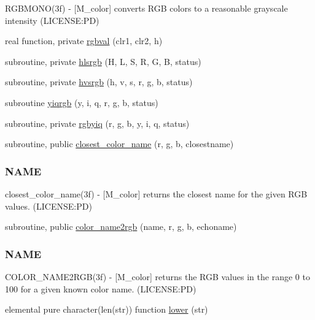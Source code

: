 \begin{DoxyCompactItemize}
\begin{DoxyCompactList}
R\+G\+B\+M\+O\+N\+O(3f) -\/ \mbox{[}M\+\_\+color\mbox{]} converts R\+GB colors to a reasonable grayscale intensity (L\+I\+C\+E\+N\+SE\+:PD) \end{DoxyCompactList}\item 
real function, private \mbox{\hyperlink{namespacem__color_a3e97e24dba7b820f685f13eaa64a6caa}{rgbval}} (clr1, clr2, h)
\item 
subroutine, private \mbox{\hyperlink{namespacem__color_a40e6c91da216384eded2157cdaf86eba}{hlsrgb}} (H, L, S, R, G, B, status)
\item 
subroutine, private \mbox{\hyperlink{namespacem__color_a334ec90d94bbfb9a4c08c5f9efdb8c47}{hvsrgb}} (h, v, s, r, g, b, status)
\item 
subroutine \mbox{\hyperlink{namespacem__color_ac9cd845fb9975144a6deb3a21ce29a29}{yiqrgb}} (y, i, q, r, g, b, status)
\item 
subroutine, private \mbox{\hyperlink{namespacem__color_a386d004a1392b7e01ff66f1676d43def}{rgbyiq}} (r, g, b, y, i, q, status)
\item 
subroutine, public \mbox{\hyperlink{namespacem__color_acad72628ee0b77cf87f40cd46734fb18}{closest\+\_\+color\+\_\+name}} (r, g, b, closestname)
\begin{DoxyCompactList}\small\item\em \subsubsection*{N\+A\+ME}

closest\+\_\+color\+\_\+name(3f) -\/ \mbox{[}M\+\_\+color\mbox{]} returns the closest name for the given R\+GB values. (L\+I\+C\+E\+N\+SE\+:PD) \end{DoxyCompactList}\item 
subroutine, public \mbox{\hyperlink{namespacem__color_a84a36043d278bc56a7148483a862dec8}{color\+\_\+name2rgb}} (name, r, g, b, echoname)
\begin{DoxyCompactList}\small\item\em \subsubsection*{N\+A\+ME}

C\+O\+L\+O\+R\+\_\+\+N\+A\+M\+E2\+R\+G\+B(3f) -\/ \mbox{[}M\+\_\+color\mbox{]} returns the R\+GB values in the range 0 to 100 for a given known color name. (L\+I\+C\+E\+N\+SE\+:PD) \end{DoxyCompactList}\item 
elemental pure character(len(str)) function \mbox{\hyperlink{namespacem__color_a704e93b42d777a827ec557c92d2dd7dc}{lower}} (str)
\end{DoxyCompactItemize}


